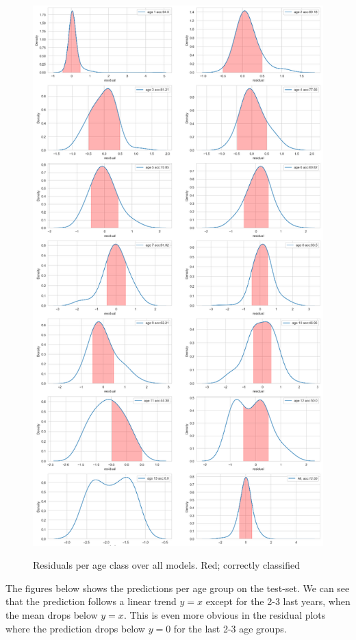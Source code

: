 \documentclass[10pt,letterpaper]{article}
\begin{document}
\begin{figure}[h!]
  \caption{Residuals per age class over all models. Red; correctly classified}
  \centering
  \includegraphics[scale=0.46]{results/eda/acc_by_age_dist.png}
  \label{age_acc}
\end{figure}

The figures below shows the predictions per age group on the test-set. We
can see that the prediction follows a linear trend $y=x$ except for the 2-3 last years,
when the mean drops below $y=x$. This is even more obvious in the residual plots
where the prediction drops below $y=0$ for the last 2-3 age groups.
\end{document}
